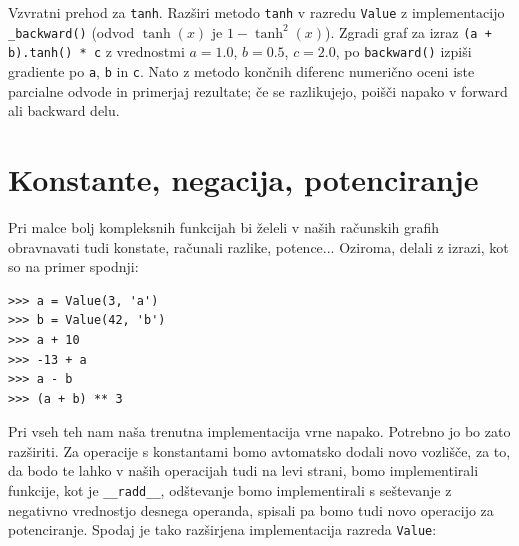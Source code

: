 \begin{exercise}{Vzvratni prehod za \texttt{tanh}.}
Razširi metodo \texttt{tanh} v razredu \texttt{Value} z implementacijo \texttt{\_backward()} (odvod $\tanh(x)$ je $1-\tanh^2(x)$). Zgradi graf za izraz \texttt{(a + b).tanh() * c} z vrednostmi $a=1.0$, $b=0.5$, $c=2.0$, po \texttt{backward()} izpiši gradiente po \texttt{a}, \texttt{b} in \texttt{c}. Nato z metodo končnih diferenc numerično oceni iste parcialne odvode in primerjaj rezultate; če se razlikujejo, poišči napako v forward ali backward delu.
\end{exercise}

\section{Konstante, negacija, potenciranje}

Pri malce bolj kompleksnih funkcijah bi želeli v naših računskih grafih obravnavati tudi konstate, računali razlike, potence... Oziroma, delali z izrazi, kot so na primer spodnji:

\vspace*{3mm}
\begin{lstlisting}
>>> a = Value(3, 'a')
>>> b = Value(42, 'b')
>>> a + 10
>>> -13 + a
>>> a - b
>>> (a + b) ** 3
\end{lstlisting}

Pri vseh teh nam naša trenutna implementacija vrne napako. Potrebno jo bo zato razširiti. Za operacije s konstantami bomo avtomatsko dodali novo vozlišče, za to, da bodo te lahko v naših operacijah tudi na levi strani, bomo implementirali funkcije, kot je \texttt{\_\_radd\_\_}, odštevanje bomo implementirali s seštevanje z negativno vrednostjo desnega operanda, spisali pa bomo tudi novo operacijo za potenciranje. Spodaj je tako razširjena implementacija razreda \texttt{Value}:

